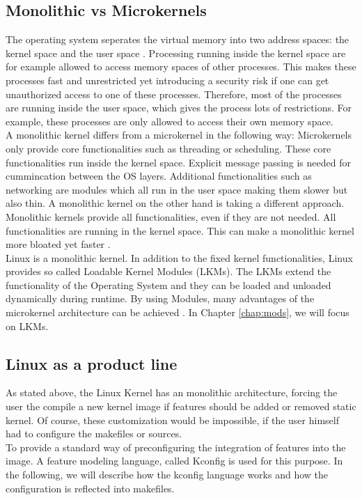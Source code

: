 \documentclass{sig-alternate-05-2015}
\begin{document}
\subsection{Monolithic vs Microkernels}
 The operating system seperates the virtual memory into two address spaces: the kernel space and the user space \cite{stankov2006discussion}. Processing running inside the kernel space are for example allowed to access memory spaces of other processes. This makes these processes fast and unrestricted yet introducing a security risk if one can get unauthorized access to one of these processes. Therefore, most of the processes are running inside the user space, which gives the process lots of restrictions. For example, these processes are only allowed to access their own memory space. \\ A monolithic kernel differs from a microkernel in the following way: Microkernels only provide core functionalities such as threading or scheduling.  These core functionalities run inside the kernel space. Explicit message passing is needed for cummincation between the OS layers. Additional functionalities such as networking are  modules which all run in the user space making them slower but also thin.  A monolithic kernel on the other hand is taking a different approach. Monolithic kernels provide all functionalities, even if they are not needed. All functionalities are running in the kernel space. This can make a monolithic kernel more bloated yet faster . \\
Linux is a monolithic kernel. In addition to the fixed kernel functionalities, Linux provides so called Loadable Kernel Modules (LKMs). The LKMs extend the functionality of the Operating System and they can be loaded and unloaded dynamically during runtime. By using Modules,  many advantages of the microkernel architecture can be achieved \cite[pp. 11]{bovet2005understanding}. In Chapter \ref{chap:mods}, we will focus on LKMs. \\


\subsection{Linux as a product line}
As stated above, the Linux Kernel has an monolithic architecture, forcing the user the compile a new kernel image if features should be added or removed static kernel. Of course, these customization would be impossible, if the user himself had to configure the makefiles or sources.\\
To provide a standard way of preconfiguring the integration of features into the image. A feature modeling language, called Kconfig \cite{kconfig} is used for this purpose. In the following, we will describe how the kconfig language works and how the configuration is reflected into makefiles.
\end{document}
